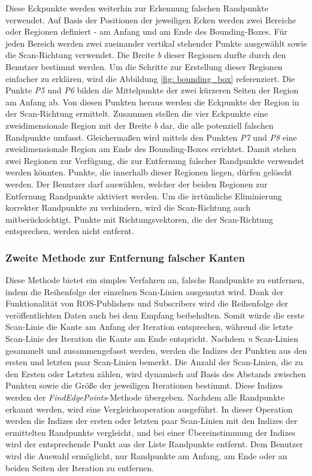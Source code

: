 Diese Eckpunkte werden weiterhin zur Erkennung falschen Randpunkte verwendet. Auf Basis der Positionen der jeweiligen Ecken werden zwei Bereiche oder Regionen definiert - am Anfang und am Ende des Bounding-Boxes. Für jeden Bereich werden zwei zueinander vertikal stehender Punkte ausgewählt sowie die Scan-Richtung verwendet. Die Breite \textit{b} dieser Regionen durfte durch den Benutzer bestimmt werden. Um die Schritte zur Erstellung dieser Regionen einfacher zu erklären, wird die Abbildung \ref{fig: bounding_box} referenziert. Die Punkte \textit{P5} und \textit{P6} bilden die Mittelpunkte der zwei kürzeren Seiten der Region am Anfang ab. Von diesen Punkten heraus werden die Eckpunkte der Region in der Scan-Richtung ermittelt. Zusammen stellen die vier Eckpunkte eine zweidimensionale Region mit der Breite \textit{b} dar, die alle potenziell falschen Randpunkte umfasst. Gleichermaßen wird mittels den Punkten \textit{P7} und \textit{P8} eine zweidimensionale Region am Ende des Bounding-Boxes errichtet. Damit stehen zwei Regionen zur Verfügung, die zur Entfernung falscher Randpunkte verwendet werden könnten. Punkte, die innerhalb dieser Regionen liegen, dürfen gelöscht werden. Der Benutzer darf auswählen, welcher der beiden Regionen zur Entfernung Randpunkte aktiviert werden. Um die irrtümliche Eliminierung korrekter Randpunkte zu verhindern, wird die Scan-Richtung auch mitberücksichtigt. Punkte mit Richtungsvektoren, die der Scan-Richtung entsprechen, werden nicht entfernt. 


\subsubsection{Zweite Methode zur Entfernung falscher Kanten}
Diese Methode bietet ein simples Verfahren an, falsche Randpunkte zu entfernen, indem die Reihenfolge der einzelnen Scan-Linien ausgenutzt wird. Dank der Funktionalität von ROS-Publishers und Subscribers wird die Reihenfolge der veröffentlichten Daten auch bei dem Empfang beibehalten. Somit würde die erste Scan-Linie die Kante am Anfang der Iteration entsprechen, während die letzte Scan-Linie der Iteration die Kante am Ende entspricht. Nachdem \textit{n} Scan-Linien gesammelt und zusammengefasst werden, werden die Indizes der Punkten aus den ersten und letzten paar Scan-Linien bemerkt. Die Anzahl der Scan-Linien, die zu den Ersten oder Letzten zählen, wird dynamisch auf Basis des Abstands zwischen Punkten sowie die Größe der jeweiligen Iterationen bestimmt. Diese Indizes werden der \textit{FindEdgePoints}-Methode übergeben. Nachdem alle Randpunkte erkannt werden, wird eine Vergleichsoperation ausgeführt. In dieser Operation werden die Indizes der ersten oder letzten paar Scan-Linien mit den Indizes der ermittelten Randpunkte vergleicht, und bei einer Übereinstimmung der Indizes wird der entsprechende Punkt aus der Liste Randpunkte entfernt. Dem Benutzer wird die Auswahl ermöglicht, nur Randpunkte am Anfang, am Ende oder an beiden Seiten der Iteration zu entfernen.

